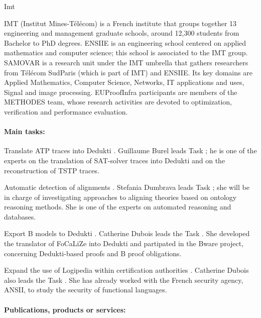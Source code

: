 \begin{sitedescription}{Imt}


IMT (Institut Mines-T\'el\'ecom) is a French institute that groups together 13 engineering and management graduate schools, around 12,300 students from Bachelor to PhD degrees.
ENSIIE is an engineering school centered on applied mathematics and computer science; this school is associated to the IMT group. SAMOVAR is a research unit under the IMT umbrella that gathers researchers from T\'el\'ecom SudParis (which is part of IMT) and ENSIIE. Its key domains are Applied Mathematics,  Computer Science, Networks, IT applications and uses, Signal and image processing. EUProofInfra participants are members of the METHODES team, whose research activities are devoted to
optimization, verification and performance evaluation.

\paragraph*{Main tasks:}

\begin{compactitem}
\item Translate ATP traces into Dedukti . Guillaume Burel leads Task ; he is one
of the experts on the translation of SAT-solver traces into Dedukti and on the reconstruction of TSTP traces.
\item Automatic detection of alignments . Stefania Dumbrava leads Task ; she will be 
in charge of investigating approaches to aligning theories based on ontology reasoning methods. She is one of the experts on automated reasoning and databases.
\item Export B models to Dedukti . Catherine Dubois leads the Task . She developed the translator of FoCaLiZe into Dedukti and 
partipated in the Bware project, concerning Dedukti-based proofs and B proof obligations. 
\item Expand the use of Logipedia within certification authorities . Catherine Dubois also leads the Task . She has already worked 
with the French security agency, ANSII, to study the security of functional languages.
\end{compactitem}

\paragraph*{Publications, products or services:}


\end{sitedescription}
